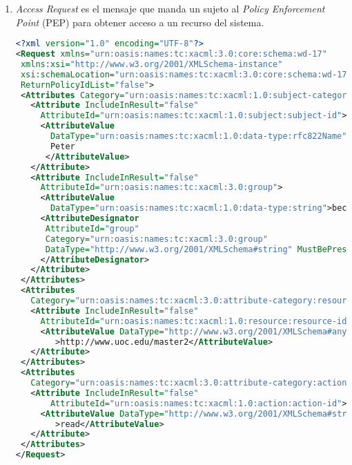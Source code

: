 \documentclass[10pt,a4paper]{article}
\begin{document}
\begin{enumerate}[label=\alph*]
\item \textit{Access Request} es el mensaje que manda un sujeto al \textit{Policy Enforcement Point} (PEP) para obtener acceso a un recurso del sistema.\\
\begin{lstlisting}[language=XML]
<?xml version="1.0" encoding="UTF-8"?>
<Request xmlns="urn:oasis:names:tc:xacml:3.0:core:schema:wd-17"
 xmlns:xsi="http://www.w3.org/2001/XMLSchema-instance"
 xsi:schemaLocation="urn:oasis:names:tc:xacml:3.0:core:schema:wd-17 http://docs.oasis-open.org/xacml/3.0/xacml-core-v3-schema-wd-17.xsd"
 ReturnPolicyIdList="false">
 <Attributes Category="urn:oasis:names:tc:xacml:1.0:subject-category:access-subject">
   <Attribute IncludeInResult="false"
     AttributeId="urn:oasis:names:tc:xacml:1.0:subject:subject-id">
     <AttributeValue
       DataType="urn:oasis:names:tc:xacml:1.0:data-type:rfc822Name">
       Peter
      </AttributeValue>
   </Attribute>
   <Attribute IncludeInResult="false"
     AttributeId="urn:oasis:names:tc:xacml:3.0:group">
     <AttributeValue
       DataType="urn:oasis:names:tc:xacml:1.0:data-type:string">becario</AttributeValue>
     <AttributeDesignator
	  AttributeId="group"
	  Category="urn:oasis:names:tc:xacml:3.0:group"
	  DataType="http://www.w3.org/2001/XMLSchema#string" MustBePresent="true">
	 </AttributeDesignator>
   </Attribute>
 </Attributes>
 <Attributes
   Category="urn:oasis:names:tc:xacml:3.0:attribute-category:resource">
   <Attribute IncludeInResult="false"
     AttributeId="urn:oasis:names:tc:xacml:1.0:resource:resource-id">
     <AttributeValue DataType="http://www.w3.org/2001/XMLSchema#anyURI"
        >http://www.uoc.edu/master2</AttributeValue>
   </Attribute>
 </Attributes>
 <Attributes
   Category="urn:oasis:names:tc:xacml:3.0:attribute-category:action">
   <Attribute IncludeInResult="false"
       AttributeId="urn:oasis:names:tc:xacml:1.0:action:action-id">
     <AttributeValue DataType="http://www.w3.org/2001/XMLSchema#string"
        >read</AttributeValue>
   </Attribute>
 </Attributes>
</Request>
\end{lstlisting}

\end{enumerate}

\pagebreak
\end{document}
